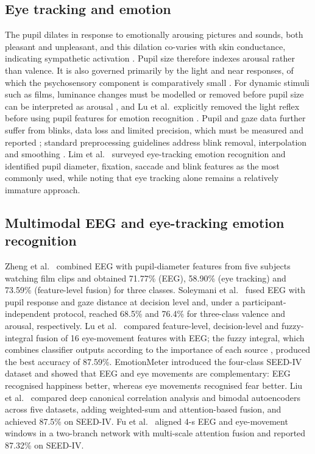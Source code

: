 \documentclass[11pt,a4paper]{article}
\begin{document}
\subsection{Eye tracking and emotion}
The pupil dilates in response to emotionally arousing pictures and sounds, both pleasant and unpleasant, and this dilation co-varies with skin conductance, indicating sympathetic activation \cite{Bradley2008,Partala2003}. Pupil size therefore indexes arousal rather than valence. It is also governed primarily by the light and near responses, of which the psychosensory component is comparatively small \cite{Mathot2018}. For dynamic stimuli such as films, luminance changes must be modelled or removed before pupil size can be interpreted as arousal \cite{Raiturkar2016}, and Lu et al.\ explicitly removed the light reflex before using pupil features for emotion recognition \cite{Lu2015}. Pupil and gaze data further suffer from blinks, data loss and limited precision, which must be measured and reported \cite{Holmqvist2012}; standard preprocessing guidelines address blink removal, interpolation and smoothing \cite{Kret2019}. Lim et al.\ \cite{Lim2020} surveyed eye-tracking emotion recognition and identified pupil diameter, fixation, saccade and blink features as the most commonly used, while noting that eye tracking alone remains a relatively immature approach.

\subsection{Multimodal EEG and eye-tracking emotion recognition}
Zheng et al.\ \cite{ZhengDong2014} combined EEG with pupil-diameter features from five subjects watching film clips and obtained 71.77\% (EEG), 58.90\% (eye tracking) and 73.59\% (feature-level fusion) for three classes. Soleymani et al.\ \cite{Soleymani2012mm} fused EEG with pupil response and gaze distance at decision level and, under a participant-independent protocol, reached 68.5\% and 76.4\% for three-class valence and arousal, respectively. Lu et al.\ \cite{Lu2015} compared feature-level, decision-level and fuzzy-integral fusion of 16 eye-movement features with EEG; the fuzzy integral, which combines classifier outputs according to the importance of each source \cite{ChoKim1995}, produced the best accuracy of 87.59\%. EmotionMeter \cite{Zheng2019} introduced the four-class SEED-IV dataset and showed that EEG and eye movements are complementary: EEG recognised happiness better, whereas eye movements recognised fear better. Liu et al.\ \cite{Liu2022} compared deep canonical correlation analysis and bimodal autoencoders across five datasets, adding weighted-sum and attention-based fusion, and achieved 87.5\% on SEED-IV. Fu et al.\ \cite{Fu2023} aligned 4-s EEG and eye-movement windows in a two-branch network with multi-scale attention fusion and reported 87.32\% on SEED-IV.
\end{document}
